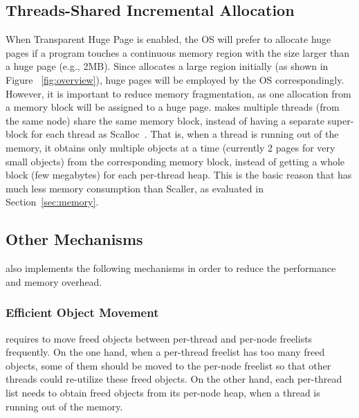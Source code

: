 \subsection{Threads-Shared Incremental Allocation} 
When Transparent Huge Page is enabled, the OS will prefer to allocate huge pages if a program touches a continuous memory region with the size larger than a huge page (e.g., 2MB). Since \NM{} allocates a large region initially (as shown in Figure ~\ref{fig:overview}), huge pages will be employed by the OS correspondingly. However, it is important to reduce memory fragmentation, as one allocation from a memory block will be assigned to a huge page. \NM{} makes multiple threads (from the same node) share the same memory block, instead of having a separate super-block for each thread as Scalloc~\cite{Scalloc}. That is, when a thread is running out of the memory, it obtains only multiple objects at a time (currently 2 pages for very small objects) from the corresponding memory block, instead of getting a whole block (few megabytes) for each per-thread heap. This is the basic reason that \NM{} has much less memory consumption than Scaller, as evaluated in Section~\ref{sec:memory}.  

\subsection{Other Mechanisms}
\label{sec:others}

\NM{} also implements the following mechanisms in order to reduce the performance and memory overhead. 

\subsubsection{Efficient Object Movement} 
\NM{} requires to move freed objects between per-thread and per-node freelists frequently. On the one hand, when a per-thread freelist has too many freed objects, some of them should be moved to the per-node freelist so that other threads could re-utilize these freed objects. On the other hand, each per-thread list needs to obtain freed objects from its per-node heap, when a thread is running out of the memory. 


